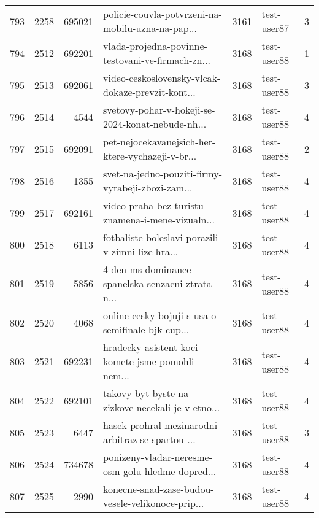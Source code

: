 \begin{tabular}{lrrlrlr}
793  &       2258 &   695021 &  policie-couvla-potvrzeni-na-mobilu-uzna-na-pap... &     3161 &                  test-user87 &               3 \\
794  &       2512 &   692201 &  vlada-projedna-povinne-testovani-ve-firmach-zn... &     3168 &                  test-user88 &               1 \\
795  &       2513 &   692061 &  video-ceskoslovensky-vlcak-dokaze-prevzit-kont... &     3168 &                  test-user88 &               3 \\
796  &       2514 &     4544 &  svetovy-pohar-v-hokeji-se-2024-konat-nebude-nh... &     3168 &                  test-user88 &               4 \\
797  &       2515 &   692091 &  pet-nejocekavanejsich-her-ktere-vychazeji-v-br... &     3168 &                  test-user88 &               2 \\
798  &       2516 &     1355 &  svet-na-jedno-pouziti-firmy-vyrabeji-zbozi-zam... &     3168 &                  test-user88 &               4 \\
799  &       2517 &   692161 &  video-praha-bez-turistu-znamena-i-mene-vizualn... &     3168 &                  test-user88 &               4 \\
800  &       2518 &     6113 &  fotbaliste-boleslavi-porazili-v-zimni-lize-hra... &     3168 &                  test-user88 &               4 \\
801  &       2519 &     5856 &  4-den-ms-dominance-spanelska-senzacni-ztrata-n... &     3168 &                  test-user88 &               4 \\
802  &       2520 &     4068 &  online-cesky-bojuji-s-usa-o-semifinale-bjk-cup... &     3168 &                  test-user88 &               4 \\
803  &       2521 &   692231 &  hradecky-asistent-koci-komete-jsme-pomohli-nem... &     3168 &                  test-user88 &               4 \\
804  &       2522 &   692101 &  takovy-byt-byste-na-zizkove-necekali-je-v-etno... &     3168 &                  test-user88 &               4 \\
805  &       2523 &     6447 &  hasek-prohral-mezinarodni-arbitraz-se-spartou-... &     3168 &                  test-user88 &               3 \\
806  &       2524 &   734678 &  ponizeny-vladar-neresme-osm-golu-hledme-dopred... &     3168 &                  test-user88 &               4 \\
807  &       2525 &     2990 &  konecne-snad-zase-budou-vesele-velikonoce-prip... &     3168 &                  test-user88 &               4 \\

\end{tabular}
